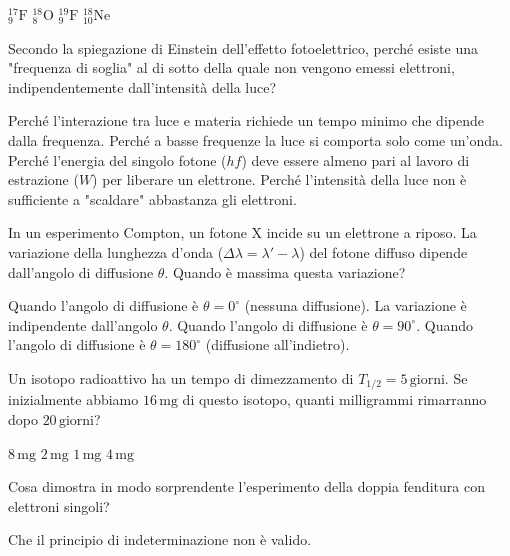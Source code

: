\documentclass{exam}%
\begin{document}
\begin{questions}
\begin{multicols}{4}
\begin{choices}
\choice $^{17}_{9}\text{F}$%
\choice $^{18}_{8}\text{O}$%
\choice $^{19}_{9}\text{F}$%
\choice $^{18}_{10}\text{Ne}$%
\end{choices}%
\end{multicols}%
\question Secondo la spiegazione di Einstein dell'effetto fotoelettrico, perché esiste una "frequenza di soglia" al di sotto della quale non vengono emessi elettroni, indipendentemente dall'intensità della luce?%
\vspace{0.2em}%
\begin{choices}%
\choice Perché l'interazione tra luce e materia richiede un tempo minimo che dipende dalla frequenza.%
\choice Perché a basse frequenze la luce si comporta solo come un'onda.%
\choice Perché l'energia del singolo fotone ($hf$) deve essere almeno pari al lavoro di estrazione ($W$) per liberare un elettrone.%
\choice Perché l'intensità della luce non è sufficiente a "scaldare" abbastanza gli elettroni.%
\end{choices}%
\question In un esperimento Compton, un fotone X incide su un elettrone a riposo. La variazione della lunghezza d'onda ($\Delta \lambda = \lambda' - \lambda$) del fotone diffuso dipende dall'angolo di diffusione $\theta$. Quando è massima questa variazione?%
\vspace{0.2em}%
\begin{choices}%
\choice Quando l'angolo di diffusione è $\theta = 0^\circ$ (nessuna diffusione).%
\choice La variazione è indipendente dall'angolo $\theta$.%
\choice Quando l'angolo di diffusione è $\theta = 90^\circ$.%
\choice Quando l'angolo di diffusione è $\theta = 180^\circ$ (diffusione all'indietro).%
\end{choices}%
\question Un isotopo radioattivo ha un tempo di dimezzamento di $T_{1/2} = 5 \, \text{giorni}$. Se inizialmente abbiamo $16 \, \text{mg}$ di questo isotopo, quanti milligrammi rimarranno dopo $20 \, \text{giorni}$?%
\vspace{0.2em}%
\begin{multicols}{4}%
\begin{choices}%
\choice $8 \, \text{mg}$%
\choice $2 \, \text{mg}$%
\choice $1 \, \text{mg}$%
\choice $4 \, \text{mg}$%
\end{choices}%
\end{multicols}%
\question Cosa dimostra in modo sorprendente l'esperimento della doppia fenditura con elettroni singoli?%
\vspace{0.2em}%
\begin{choices}%
\choice Che il principio di indeterminazione non è valido.%

\end{choices}
\end{questions}
\end{document}

